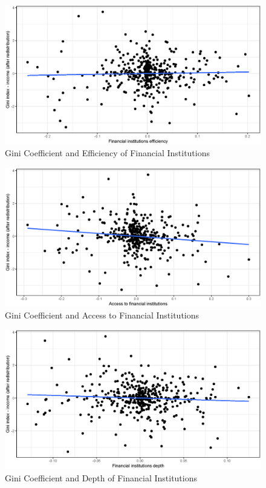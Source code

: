 \documentclass[a4paper,11pt]{article}
\begin{document}
\begin{figure}
    \caption{Gini Coefficient and Efficiency of Financial Institutions}
\includegraphics[width=\textwidth, keepaspectratio]{figures/FIEGiniNet_dm}
\end{figure}

\begin{figure}
    \caption{Gini Coefficient and Access to Financial Institutions}
\includegraphics[width=\textwidth, keepaspectratio]{figures/FIAGiniNet_dm}
\end{figure}

\begin{figure}
    \caption{Gini Coefficient and Depth of Financial Institutions}
\includegraphics[width=\textwidth, keepaspectratio]{figures/FIDGiniNet_dm}
\end{figure}
\end{document}
